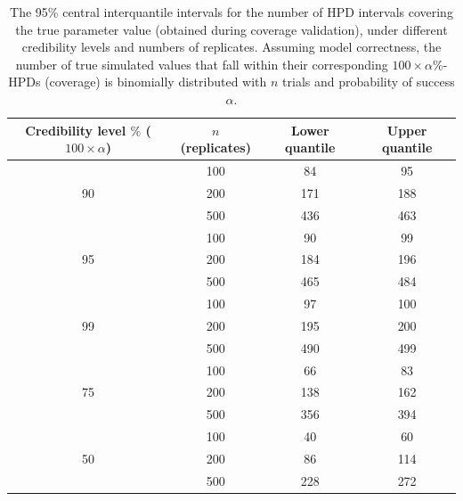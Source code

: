 \documentclass[oneside]{article}
\begin{document}
\begin{table}
\begin{center}
\begin{tabular}{cccc}
\hline
Credibility level $\%$ ($100 \times \alpha$) & $n$ (replicates) & Lower quantile & Upper quantile \\ \hline
  \rowcolor{gray!10}   & 100            & 84    & 95    \\
  \rowcolor{gray!10}90 & 200            & 171   & 188   \\
  \rowcolor{gray!10}   & 500            & 436   & 463   \\
                       & 100            & 90    & 99    \\
                  95   & 200            & 184   & 196   \\
                       & 500            & 465   & 484   \\
  \rowcolor{gray!10}   & 100            & 97    & 100   \\
  \rowcolor{gray!10}99 & 200            & 195   & 200   \\
  \rowcolor{gray!10}   & 500            & 490   & 499   \\
                       & 100            & 66    & 83    \\
                 75    & 200            & 138   & 162   \\
                       & 500            & 356   & 394   \\             
  \rowcolor{gray!10}   & 100            & 40    & 60    \\
  \rowcolor{gray!10}50 & 200            & 86    & 114   \\   
  \rowcolor{gray!10}   & 500            & 228   & 272   \\ \hline%
\end{tabular}
\end{center}
\caption{The 95\% central interquantile intervals for the number of HPD intervals covering the true parameter value (obtained during coverage validation), under different credibility levels and numbers of replicates.
  Assuming model correctness, the number of true simulated values that fall within their corresponding $100 \times \alpha$\%-HPDs (coverage) is binomially distributed with $n$ trials and probability of success $\alpha$.}
\label{tab:coverage2}
\end{table}
\end{document}
